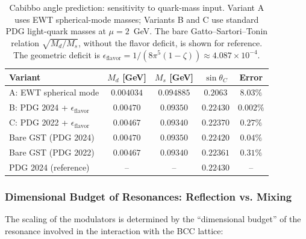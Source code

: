 \documentclass[10pt,a4paper]{article}
\begin{document}
\begin{table}[h]
	\centering
	\caption{Cabibbo angle prediction: sensitivity to quark-mass input.
		Variant A uses EWT spherical-mode masses; Variants B and C use
		standard PDG light-quark masses at $\mu = 2$~GeV. The bare
		Gatto--Sartori--Tonin relation $\sqrt{M_d/M_s}$, without the
		flavor deficit, is shown for reference. The geometric deficit
		is $\epsilon_{\text{flavor}} = 1/(8\pi^5(1-\zeta)) \approx
		4.087 \times 10^{-4}$.}
	\label{tab:cabibbo_variants}
	\begin{tabular}{lcccc}
		\toprule
		\textbf{Variant} & $M_d$ \textbf{[GeV]} & $M_s$ \textbf{[GeV]}
		& $\sin\theta_C$ & \textbf{Error} \\
		\midrule
		A: EWT spherical mode
		& $0.004034$ & $0.094885$ & $0.2063$ & $8.03\%$ \\
		B: PDG 2024 + $\epsilon_{\text{flavor}}$
		& $0.00470$ & $0.09350$ & $0.22430$ & $0.002\%$ \\
		C: PDG 2022 + $\epsilon_{\text{flavor}}$
		& $0.00467$ & $0.09340$ & $0.22370$ & $0.27\%$ \\
		\midrule
		Bare GST (PDG 2024)
		& $0.00470$ & $0.09350$ & $0.22420$ & $0.04\%$ \\
		Bare GST (PDG 2022)
		& $0.00467$ & $0.09340$ & $0.22361$ & $0.31\%$ \\
		\midrule
		PDG 2024 (reference)
		& -- & -- & $0.22430$ & -- \\
		\bottomrule
	\end{tabular}
\end{table}

\subsubsection{Dimensional Budget of Resonances: Reflection vs. Mixing}

The scaling of the modulators is determined by the ``dimensional budget''
of the resonance involved in the interaction with the BCC lattice:
\end{document}
